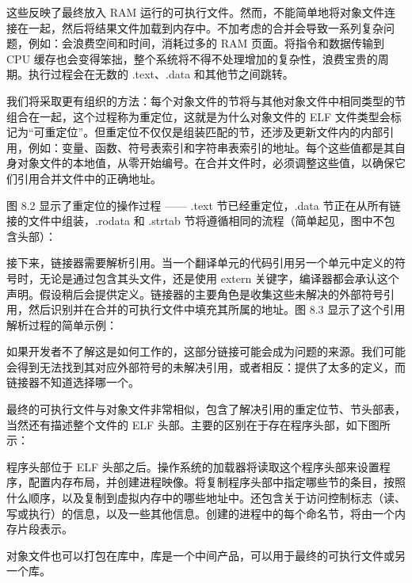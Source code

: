 这些反映了最终放入 RAM 运行的可执行文件。然而，不能简单地将对象文件连接在一起，然后将结果文件加载到内存中。不加考虑的合并会导致一系列复杂问题，例如：会浪费空间和时间，消耗过多的 RAM 页面。将指令和数据传输到 CPU 缓存也会变得笨拙，整个系统将不得不处理增加的复杂性，浪费宝贵的周期。执行过程会在无数的 .text、.data 和其他节之间跳转。

我们将采取更有组织的方法：每个对象文件的节将与其他对象文件中相同类型的节组合在一起，这个过程称为重定位，这就是为什么对象文件的 ELF 文件类型会标记为“可重定位”。但重定位不仅仅是组装匹配的节，还涉及更新文件内的内部引用，例如：变量、函数、符号表索引和字符串表索引的地址。每个这些值都是其自身对象文件的本地值，从零开始编号。在合并文件时，必须调整这些值，以确保它们引用合并文件中的正确地址。

图 8.2 显示了重定位的操作过程 —— .text 节已经重定位，.data 节正在从所有链接的文件中组装，.rodata 和 .strtab 节将遵循相同的流程（简单起见，图中不包含头部）：


接下来，链接器需要解析引用。当一个翻译单元的代码引用另一个单元中定义的符号时，无论是通过包含其头文件，还是使用 extern 关键字，编译器都会承认这个声明。假设稍后会提供定义。链接器的主要角色是收集这些未解决的外部符号引用，然后识别并在合并的可执行文件中填充其所属的地址。图 8.3 显示了这个引用解析过程的简单示例：


如果开发者不了解这是如何工作的，这部分链接可能会成为问题的来源。我们可能会得到无法找到其对应外部符号的未解决引用，或者相反：提供了太多的定义，而链接器不知道选择哪一个。

最终的可执行文件与对象文件非常相似，包含了解决引用的重定位节、节头部表，当然还有描述整个文件的 ELF 头部。主要的区别在于存在程序头部，如下图所示：


程序头部位于 ELF 头部之后。操作系统的加载器将读取这个程序头部来设置程序，配置内存布局，并创建进程映像。将复制程序头部中指定哪些节的条目，按照什么顺序，以及复制到虚拟内存中的哪些地址中。还包含关于访问控制标志（读、写或执行）的信息，以及一些其他信息。创建的进程中的每个命名节，将由一个内存片段表示。

对象文件也可以打包在库中，库是一个中间产品，可以用于最终的可执行文件或另一个库。

